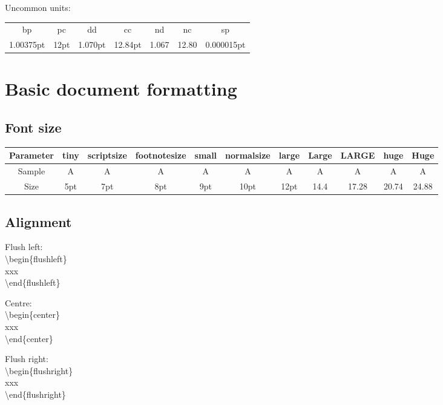 \documentclass[10pt,a4paper,fleqn]{article}
\def\bslash{\textbackslash} %
\begin{document}
Uncommon units:
\begin{tabular}[c]{|ccccccc|}
\hline
bp & pc & dd & cc & nd & nc & sp \\	
1.00375pt & 12pt & 1.070pt & 12.84pt & 1.067 & 12.80 & 0.000015pt \\
\hline
\end{tabular}

\section{Basic document formatting}
\subsection{Font size}
\begin{tabular}{|c|c|c|c|c|c|c|c|c|c|c|}
\hline
Parameter & tiny & scriptsize & footnotesize & small & normalsize & large & Large & LARGE & huge & Huge \\
\hline
Sample & {\tiny A} & {\scriptsize A} & {\footnotesize A} & {\small A} & {\normalsize A} & {\large A} & {\Large A} & {\LARGE A} & {\huge A} & {\Huge A} \\
\hline
Size & 5pt & 7pt & 8pt & 9pt & 10pt & 12pt & 14.4 & 17.28 & 20.74 & 24.88 \\
\hline
\end{tabular}

\subsection{Alignment}
\begin{multicols}{3} %
\setlength{\columnseprule}{1pt}
\def\columnseprulecolor{\color{black}}
Flush left:\\
\bslash begin\{flushleft\}\\
xxx\\
\bslash end\{flushleft\}
\columnbreak

Centre:\\
\bslash begin\{center\}\\
xxx\\
\bslash end\{center\}
\columnbreak

Flush right:\\
\bslash begin\{flushright\}\\
xxx\\
\bslash end\{flushright\}
\end{multicols}
 
\end{document}
